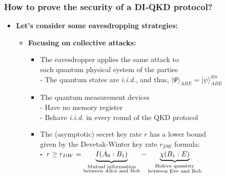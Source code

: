 \documentclass{beamer}
\newcommand\sbullet[1][.5]{\mathbin{\vcenter{\hbox{\scalebox{#1}{$\bullet$}}}}}
\begin{document}
		\begin{frame}
			\frametitle{\large How to prove the security of a DI‑QKD protocol?}

            \vspace{3ex}
            \begin{itemize}
                \item \textbf{Let's consider some eavesdropping strategies:}
                \begin{itemize}
                    \item \textbf{Focusing on collective attacks:}
                    \begin{itemize}
                        \item The eavesdropper applies the same attack to\\ each quantum physical system of the parties\\
                        - The quantum states are \textit{i.i.d.}, and thus, ${|\Psi\rangle}_{ABE} = {|\psi\rangle}_{ABE}^{\otimes n}$
                        \vspace{1ex}
                        \item The quantum measurement devices\\
                        - Have no memory register\\
                        - Behave \textit{i.i.d.} in every round of the QKD protocol
                        \vspace{2ex}
                        \item The (asymptotic) secret key rate $r$ has a lower bound\\ given by the Devetak-Winter key rate ${r}_{DW}$ formula:\\
                        $\sbullet$\, $r \geq {r}_{DW} = \underbrace{\strut I({A}_{0}:{B}_{1})}_{\substack{\text{Mutual information}\\ \text{between Alice and Bob}}} - \underbrace{\chi({B}_{1}:E)}_{\substack{\text{Holevo quantity}\\ \text{between Eve and Bob}}} $
                     \end{itemize}
                \end{itemize}
            \end{itemize}
		\end{frame}
\end{document}
